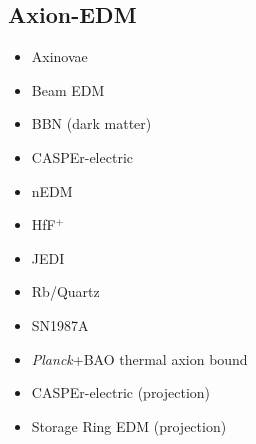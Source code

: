 \documentclass[8pt,twocolumn]{extarticle}
\begin{document}
\begin{mdframed}
\vspace{-1em}
\section{Axion-EDM}\vspace{-0.5em}
\begin{itemize}\setlength\itemsep{-0.5em}
\item Axinovae~\cite{Fox:2023aat}
	\item Beam EDM~\cite{Schulthess:2022pbp}
		\item BBN (dark matter)~\cite{Blum:2014vsa}
	\item CASPEr-electric~\cite{Aybas:2021nvn}
	\item nEDM~\cite{Abel:2017rtm}
	\item HfF$^+$~\cite{Roussy:2020ily}
	\item JEDI~\cite{JEDI:2022hxa}
	\item Rb/Quartz~\cite{Zhang:2022ewz}
	\item SN1987A~\cite{Lucente:2022vuo}
	\item \emph{Planck}+BAO thermal axion bound~\cite{Caloni:2022uya}
	\item CASPEr-electric (projection)~\cite{JacksonKimball:2017elr}	
	\item Storage Ring EDM (projection)~\cite{JacksonKimball:2017elr}	
	
\end{itemize}
\end{mdframed}
\end{document}
